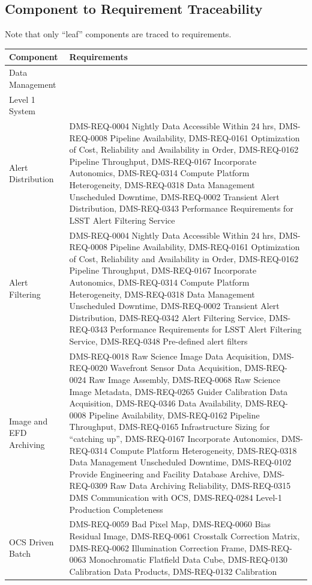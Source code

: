 \documentclass[]{article}
\begin{document}
\subsection{Component to Requirement
Traceability}\label{component-to-requirement-traceability}

Note that only ``leaf'' components are traced to requirements.

\begin{longtable}[]{@{}ll@{}}
\toprule
Component & Requirements\tabularnewline
\midrule
\endhead
Data Management &\tabularnewline
Level 1 System &\tabularnewline
Alert Distribution & DMS-REQ-0004 Nightly Data Accessible Within 24 hrs,
DMS-REQ-0008 Pipeline Availability, DMS-REQ-0161 Optimization of Cost,
Reliability and Availability in Order, DMS-REQ-0162 Pipeline Throughput,
DMS-REQ-0167 Incorporate Autonomics, DMS-REQ-0314 Compute Platform
Heterogeneity, DMS-REQ-0318 Data Management Unscheduled Downtime,
DMS-REQ-0002 Transient Alert Distribution, DMS-REQ-0343 Performance
Requirements for LSST Alert Filtering Service\tabularnewline
Alert Filtering & DMS-REQ-0004 Nightly Data Accessible Within 24 hrs,
DMS-REQ-0008 Pipeline Availability, DMS-REQ-0161 Optimization of Cost,
Reliability and Availability in Order, DMS-REQ-0162 Pipeline Throughput,
DMS-REQ-0167 Incorporate Autonomics, DMS-REQ-0314 Compute Platform
Heterogeneity, DMS-REQ-0318 Data Management Unscheduled Downtime,
DMS-REQ-0002 Transient Alert Distribution, DMS-REQ-0342 Alert Filtering
Service, DMS-REQ-0343 Performance Requirements for LSST Alert Filtering
Service, DMS-REQ-0348 Pre-defined alert filters\tabularnewline
Image and EFD Archiving & DMS-REQ-0018 Raw Science Image Data
Acquisition, DMS-REQ-0020 Wavefront Sensor Data Acquisition,
DMS-REQ-0024 Raw Image Assembly, DMS-REQ-0068 Raw Science Image
Metadata, DMS-REQ-0265 Guider Calibration Data Acquisition, DMS-REQ-0346
Data Availability, DMS-REQ-0008 Pipeline Availability, DMS-REQ-0162
Pipeline Throughput, DMS-REQ-0165 Infrastructure Sizing for ``catching
up'', DMS-REQ-0167 Incorporate Autonomics, DMS-REQ-0314 Compute Platform
Heterogeneity, DMS-REQ-0318 Data Management Unscheduled Downtime,
DMS-REQ-0102 Provide Engineering and Facility Database Archive,
DMS-REQ-0309 Raw Data Archiving Reliability, DMS-REQ-0315 DMS
Communication with OCS, DMS-REQ-0284 Level-1 Production
Completeness\tabularnewline
OCS Driven Batch & DMS-REQ-0059 Bad Pixel Map, DMS-REQ-0060 Bias
Residual Image, DMS-REQ-0061 Crosstalk Correction Matrix, DMS-REQ-0062
Illumination Correction Frame, DMS-REQ-0063 Monochromatic Flatfield Data
Cube, DMS-REQ-0130 Calibration Data Products, DMS-REQ-0132 Calibration

\end{longtable}
\end{document}
